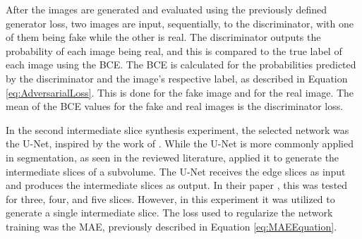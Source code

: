 After the images are generated and evaluated using the previously defined generator loss, two images are input, sequentially, to the discriminator, with one of them being fake while the other is real. The discriminator outputs the probability of each image being real, and this is compared to the true label of each image using the BCE. The BCE is calculated for the probabilities predicted by the discriminator and the image's respective label, as described in Equation \ref{eq:AdversarialLoss}. This is done for the fake image and for the real image. The mean of the BCE values for the fake and real images is the discriminator loss.
\par
In the second intermediate slice synthesis experiment, the selected network was the U-Net, inspired by the work of \textcite{Nishimoto2024}. While the U-Net is more commonly applied in segmentation, as seen in the reviewed literature, \textcite{Nishimoto2024} applied it to generate the intermediate slices of a subvolume. The U-Net receives the edge slices as input and produces the intermediate slices as output. In their paper \parencite{Nishimoto2024}, this was tested for three, four, and five slices. However, in this experiment it was utilized to generate a single intermediate slice. The loss used to regularize the network training was the MAE, previously described in Equation \ref{eq:MAEEquation}.

